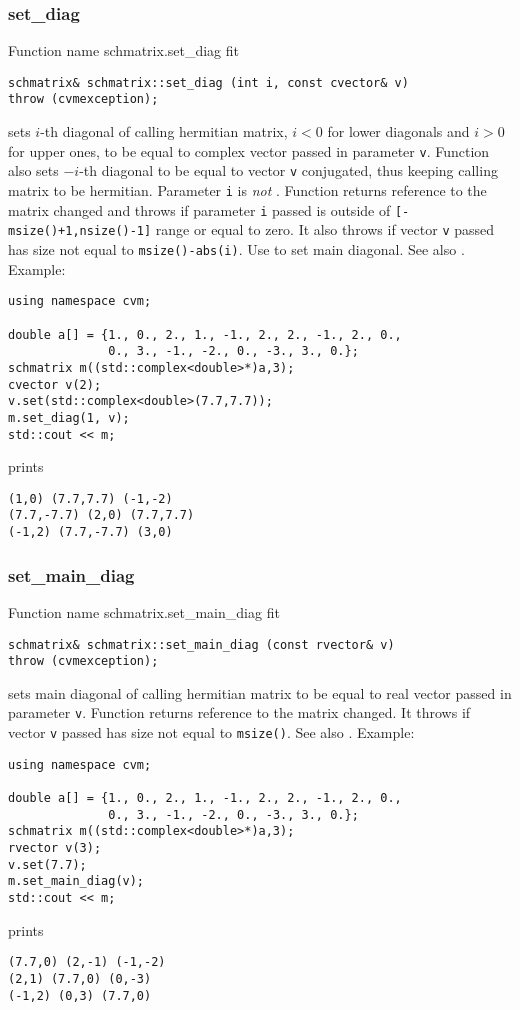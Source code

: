 \subsubsection{set\_diag}
Function%
\pdfdest name {schmatrix.set_diag} fit
\begin{verbatim}
schmatrix& schmatrix::set_diag (int i, const cvector& v)
throw (cvmexception);
\end{verbatim}
sets  \hbox{$i$-th} diagonal of  calling hermitian matrix,
$i<0$ for lower diagonals 
and $i>0$ for upper ones, to be equal to  complex vector
passed in parameter \verb"v".
Function also sets $-i$-th diagonal to
be equal to  vector \verb"v" conjugated,
thus keeping calling matrix to be hermitian.
Parameter \verb"i" is \emph{not} \Based.
Function returns  reference to
the matrix changed
and throws 
if parameter \verb"i" passed
is outside of \verb"[-msize()+1,nsize()-1]" range
or equal to zero. 
It also throws if vector \verb"v" passed has size not equal to
\verb"msize()-abs(i)".
Use 
to set  main diagonal.
See also .
Example:
\begin{Verbatim}
using namespace cvm;

double a[] = {1., 0., 2., 1., -1., 2., 2., -1., 2., 0.,
              0., 3., -1., -2., 0., -3., 3., 0.};
schmatrix m((std::complex<double>*)a,3);
cvector v(2);
v.set(std::complex<double>(7.7,7.7));
m.set_diag(1, v);
std::cout << m;
\end{Verbatim}
prints
\begin{Verbatim}
(1,0) (7.7,7.7) (-1,-2)
(7.7,-7.7) (2,0) (7.7,7.7)
(-1,2) (7.7,-7.7) (3,0)
\end{Verbatim}
\newpage



\subsubsection{set\_main\_diag}
Function%
\pdfdest name {schmatrix.set_main_diag} fit
\begin{verbatim}
schmatrix& schmatrix::set_main_diag (const rvector& v)
throw (cvmexception);
\end{verbatim}
sets  main diagonal of  calling hermitian 
matrix to be equal to  real vector
passed in parameter \verb"v".
Function returns  reference to
the matrix changed.
It throws 
if vector \verb"v" passed has  size not equal to
\verb"msize()".
See also .
Example:
\begin{Verbatim}
using namespace cvm;

double a[] = {1., 0., 2., 1., -1., 2., 2., -1., 2., 0.,
              0., 3., -1., -2., 0., -3., 3., 0.};
schmatrix m((std::complex<double>*)a,3);
rvector v(3);
v.set(7.7);
m.set_main_diag(v);
std::cout << m;
\end{Verbatim}
prints
\begin{Verbatim}
(7.7,0) (2,-1) (-1,-2)
(2,1) (7.7,0) (0,-3)
(-1,2) (0,3) (7.7,0)
\end{Verbatim}
\newpage




